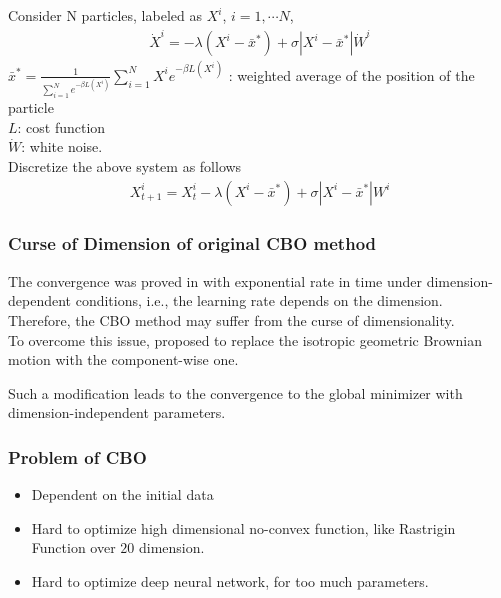 \documentclass{beamer}
\begin{document}
\begin{frame}
	   Consider N particles, labeled as $X^i$, $i =1 , \cdots N$,
   \begin{equation}
   	\begin{aligned}
   		\dot X^i = -\lambda (X^i - \bar{x}^*) +\sigma |X^i-\bar{x}^*| \dot W^i
   	\end{aligned}
   \end{equation}
   $\bar{x}^* = \frac{1}{\sum_{i=1}^N e^{-\beta L(X^i)}}\sum_{i=1}^N X^i e^{-\beta L(X^i)}$ : weighted average of the position of the particle\\
   $L$: cost function \\
   $\dot W$: white noise.\\
  Discretize the above system as follows 
     \begin{equation}
   	\begin{aligned}
   		X^i_{t+1} =  X^i_{t} -\lambda (X^i - \bar{x}^*) +\sigma |X^i-\bar{x}^*|  W^i
   	\end{aligned}
   \end{equation}
\end{frame}

\begin{frame}
\frametitle{Curse of Dimension of original CBO method}
	The convergence was proved in with exponential rate in time under dimension-dependent conditions, i.e., the learning rate depends on the dimension. \\
	Therefore, the CBO method may suffer from the curse of dimensionality.\\
To overcome this issue,  proposed to replace the isotropic geometric Brownian motion with the component-wise one.

 Such a modification leads to the convergence to the global minimizer with dimension-independent parameters. 
\end{frame}
\begin{frame}
	\frametitle{Problem of CBO}
	\begin{itemize}
		\item Dependent on the initial data
		\item Hard to optimize high dimensional no-convex function, like Rastrigin Function over $20$ dimension.
		\item Hard to optimize deep neural network, for too much parameters.
	\end{itemize}
\end{frame}
\end{document}
